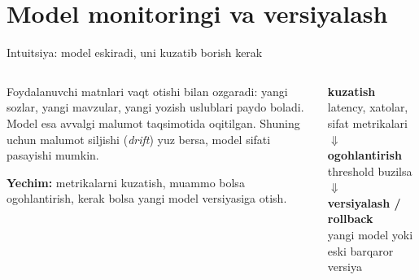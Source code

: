 \documentclass[aspectratio=169,11pt]{beamer}
\newcommand{\uzq}{\textquotesingle{}}   %
\begin{document}
\section[Monitoring]{Model monitoringi va versiyalash}

\begin{frame}{Intuitsiya: model eskiradi, uni kuzatib borish kerak}
  \small

  \begin{columns}[T,totalwidth=\textwidth]
    \begin{column}{0.52\textwidth}
      \begin{tcolorbox}[warnbox,title={Nega monitoring kerak?},top=2pt,bottom=2pt]
        \footnotesize
        Foydalanuvchi matnlari vaqt o\uzq{}tishi bilan o\uzq{}zgaradi:
        yangi so\uzq{}zlar, yangi mavzular, yangi yozish uslublari paydo bo\uzq{}ladi.\\[3pt]

        Model esa avvalgi ma\uzq{}lumot taqsimotida o\uzq{}qitilgan.
        Shuning uchun ma\uzq{}lumot siljishi (\textit{drift}) yuz bersa,
        model sifati pasayishi mumkin.
      \end{tcolorbox}

      \vspace{4pt}

      \begin{tcolorbox}[okbox,top=2pt,bottom=2pt]
        \footnotesize
        \textbf{Yechim:}
        metrikalarni kuzatish, muammo bo\uzq{}lsa ogohlantirish,
        kerak bo\uzq{}lsa yangi model versiyasiga o\uzq{}tish.
      \end{tcolorbox}
    \end{column}

    \begin{column}{0.45\textwidth}
      \begin{tcolorbox}[defbox,title={Monitoring oqimi},top=2pt,bottom=2pt]
        \centering
        \footnotesize
        \textbf{kuzatish}\\[-1pt]
        {\scriptsize latency, xatolar, sifat metrikalari}\\[2pt]
        $\Downarrow$\\[-1pt]
        \textbf{ogohlantirish}\\[-1pt]
        {\scriptsize threshold buzilsa}\\[2pt]
        $\Downarrow$\\[-1pt]
        \textbf{versiyalash / rollback}\\[-1pt]
        {\scriptsize yangi model yoki eski barqaror versiya}
      \end{tcolorbox}


\end{column}
\end{columns}
\end{frame}
\end{document}
